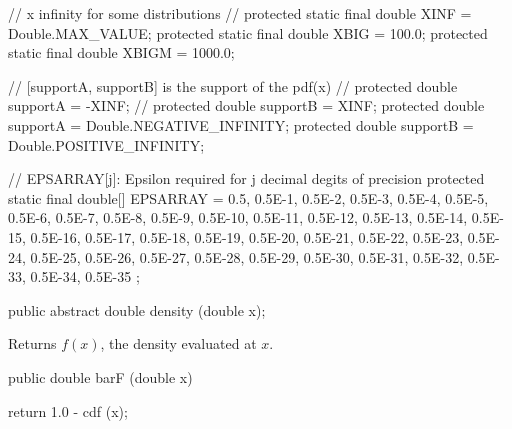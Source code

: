 \begin{code}\begin{hide}
    // x infinity for some distributions
//    protected static final double XINF = Double.MAX_VALUE;
    protected static final double XBIG = 100.0;
    protected static final double XBIGM = 1000.0;

    // [supportA, supportB] is the support of the pdf(x)
//    protected double supportA = -XINF;
//    protected double supportB = XINF;
    protected double supportA = Double.NEGATIVE_INFINITY;
    protected double supportB = Double.POSITIVE_INFINITY;

    // EPSARRAY[j]: Epsilon required for j decimal degits of precision
    protected static final double[] EPSARRAY = {
    0.5, 0.5E-1, 0.5E-2, 0.5E-3, 0.5E-4, 0.5E-5, 0.5E-6, 0.5E-7, 0.5E-8,
    0.5E-9, 0.5E-10, 0.5E-11, 0.5E-12, 0.5E-13, 0.5E-14, 0.5E-15, 0.5E-16,
    0.5E-17, 0.5E-18, 0.5E-19, 0.5E-20, 0.5E-21, 0.5E-22, 0.5E-23, 0.5E-24,
    0.5E-25, 0.5E-26, 0.5E-27, 0.5E-28, 0.5E-29, 0.5E-30, 0.5E-31, 0.5E-32,
    0.5E-33, 0.5E-34, 0.5E-35
    };\end{hide}

   public abstract double density (double x);
\end{code}
\begin{tabb} Returns $f(x)$, the density evaluated at $x$.
\end{tabb}
\begin{htmlonly}
\end{htmlonly}
%
\begin{code}

   public double barF (double x)\begin{hide} {
      return 1.0 - cdf (x);
   }\end{hide}
\end{code}
